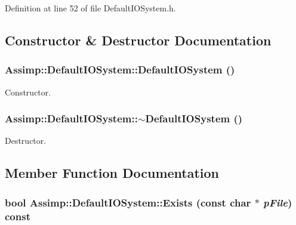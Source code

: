 Definition at line 52 of file DefaultIOSystem.h.

\subsection{Constructor \& Destructor Documentation}
\hypertarget{class_assimp_1_1_default_i_o_system_8d1b0591ff59be2823f8aaea9fb322e6}{
\subsubsection[DefaultIOSystem]{\setlength{\rightskip}{0pt plus 5cm}Assimp::DefaultIOSystem::DefaultIOSystem ()}}
\label{class_assimp_1_1_default_i_o_system_8d1b0591ff59be2823f8aaea9fb322e6}


Constructor. \hypertarget{class_assimp_1_1_default_i_o_system_25d4b5ee7d9eff449cca8ce5889b91cc}{
\subsubsection[$\sim$DefaultIOSystem]{\setlength{\rightskip}{0pt plus 5cm}Assimp::DefaultIOSystem::$\sim$DefaultIOSystem ()}}
\label{class_assimp_1_1_default_i_o_system_25d4b5ee7d9eff449cca8ce5889b91cc}


Destructor. 

\subsection{Member Function Documentation}
\hypertarget{class_assimp_1_1_default_i_o_system_f8b310025faaed12c6d65c586e935255}{
\subsubsection[Exists]{\setlength{\rightskip}{0pt plus 5cm}bool Assimp::DefaultIOSystem::Exists (const char $\ast$ {\em pFile}) const}}
\label{class_assimp_1_1_default_i_o_system_f8b310025faaed12c6d65c586e935255}


